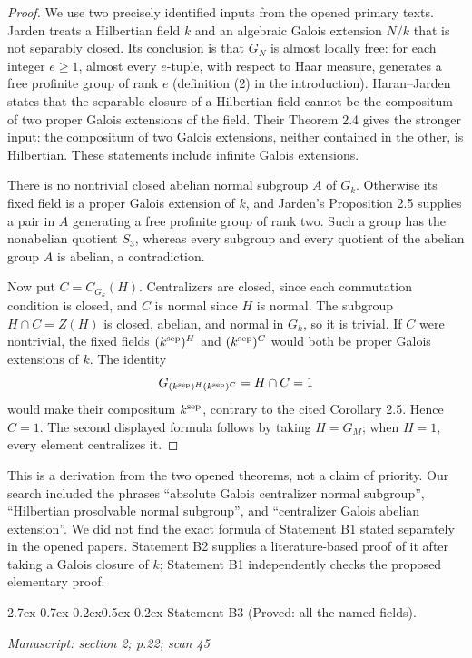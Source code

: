 \documentclass[11pt,a4paper]{article}
\makeatletter
\newcommand{\passage}[1]{\par\smallskip\noindent\textit{Manuscript: #1}\par\smallskip}
\renewcommand\paragraph{\@startsection{paragraph}{4}{\z@}%
  {2.7ex \@plus 0.7ex \@minus 0.2ex}{0.5ex \@plus 0.2ex}%
  {\normalfont\normalsize\bfseries}}
\makeatother
\begin{document}
\begin{proof}
We use two precisely identified inputs from the opened primary texts.
Jarden \cite[Proposition 2.5]{B_Jarden2011} treats a Hilbertian field $k$
and an algebraic Galois extension $N/k$ that is not separably closed. Its
conclusion is that $G_N$ is almost locally free: for each integer $e\ge1$,
almost every $e$-tuple, with respect to Haar measure, generates a free
profinite group of rank $e$ (definition (2) in the introduction).
Haran--Jarden \cite[Corollary 2.5]{B_HaranJarden1991} states that the
separable closure of a Hilbertian field cannot be the compositum of two
proper Galois extensions of the field. Their Theorem 2.4 gives the stronger
input: the compositum of two Galois extensions, neither contained in the
other, is Hilbertian. These statements include infinite Galois extensions.

There is no nontrivial closed abelian normal subgroup $A$ of $G_k$.
Otherwise its fixed field is a proper Galois extension of $k$, and Jarden's
Proposition 2.5 supplies a pair in $A$ generating a free profinite group of
rank two. Such a group has the nonabelian quotient $S_3$, whereas every
subgroup and every quotient of the abelian group $A$ is abelian, a
contradiction.

Now put $C=C_{G_k}(H)$. Centralizers are closed, since each commutation
condition is closed, and $C$ is normal since $H$ is normal. The subgroup
$H\cap C=Z(H)$ is closed, abelian, and normal in $G_k$, so it is trivial.
If $C$ were nontrivial, the fixed fields
$(k^{\rm sep})^H$ and $(k^{\rm sep})^C$ would both be proper Galois
extensions of $k$. The identity
\[
 G_{(k^{\rm sep})^H(k^{\rm sep})^C}=H\cap C=1
\]
would make their compositum $k^{\rm sep}$, contrary to the cited
Corollary 2.5. Hence $C=1$. The second displayed formula follows by taking
$H=G_M$; when $H=1$, every element centralizes it.
\end{proof}

This is a derivation from the two opened theorems, not a claim of priority.
Our search included the phrases ``absolute Galois centralizer normal
subgroup'', ``Hilbertian prosolvable normal subgroup'', and ``centralizer
Galois abelian extension''. We did not find the exact formula of Statement
B1 stated separately in the opened papers. Statement B2 supplies a
literature-based proof of it after taking a Galois closure of $k$; Statement
B1 independently checks the proposed elementary proof.

\paragraph{Statement B3 (Proved: all the named fields).}\label{res:B3}
\passage{section 2; p.22; scan 45}
\end{document}
